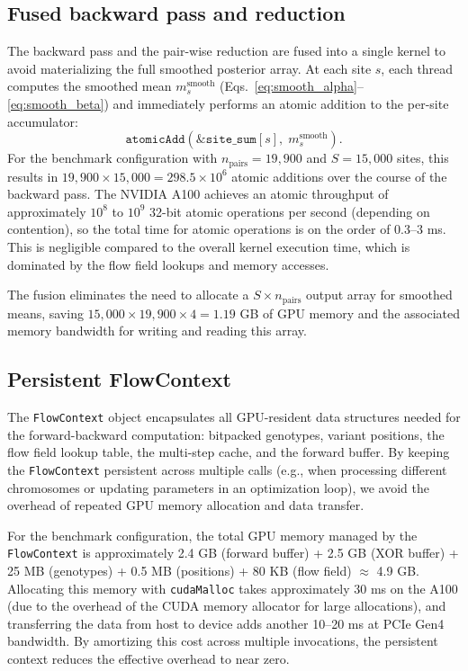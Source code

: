 \documentclass[10pt,letterpaper]{article}
\begin{document}
\subsection{Fused backward pass and reduction}

The backward pass and the pair-wise reduction are fused into a single kernel to avoid materializing the full smoothed posterior array. At each site $s$, each thread computes the smoothed mean $m^{\mathrm{smooth}}_s$ (Eqs.~\ref{eq:smooth_alpha}--\ref{eq:smooth_beta}) and immediately performs an atomic addition to the per-site accumulator:
\begin{equation}
\texttt{atomicAdd}(\&\texttt{site\_sum}[s],\; m^{\mathrm{smooth}}_s).
\end{equation}
For the benchmark configuration with $n_{\mathrm{pairs}} = 19{,}900$ and $S = 15{,}000$ sites, this results in $19{,}900 \times 15{,}000 = 298.5 \times 10^6$ atomic additions over the course of the backward pass. The NVIDIA A100 achieves an atomic throughput of approximately $10^8$ to $10^9$ 32-bit atomic operations per second (depending on contention), so the total time for atomic operations is on the order of 0.3--3 ms. This is negligible compared to the overall kernel execution time, which is dominated by the flow field lookups and memory accesses.

The fusion eliminates the need to allocate a $S \times n_{\mathrm{pairs}}$ output array for smoothed means, saving $15{,}000 \times 19{,}900 \times 4 = 1.19$ GB of GPU memory and the associated memory bandwidth for writing and reading this array.

\subsection{Persistent FlowContext}

The \texttt{FlowContext} object encapsulates all GPU-resident data structures needed for the forward-backward computation: bitpacked genotypes, variant positions, the flow field lookup table, the multi-step cache, and the forward buffer. By keeping the \texttt{FlowContext} persistent across multiple calls (e.g., when processing different chromosomes or updating parameters in an optimization loop), we avoid the overhead of repeated GPU memory allocation and data transfer.

For the benchmark configuration, the total GPU memory managed by the \texttt{FlowContext} is approximately 2.4 GB (forward buffer) + 2.5 GB (XOR buffer) + 25 MB (genotypes) + 0.5 MB (positions) + 80 KB (flow field) $\approx$ 4.9 GB. Allocating this memory with \texttt{cudaMalloc} takes approximately 30 ms on the A100 (due to the overhead of the CUDA memory allocator for large allocations), and transferring the data from host to device adds another 10--20 ms at PCIe Gen4 bandwidth. By amortizing this cost across multiple invocations, the persistent context reduces the effective overhead to near zero.
\end{document}

